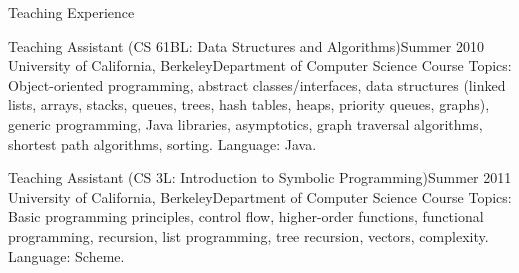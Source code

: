 \documentclass{resume}
\begin{document}
\begin{component}{Teaching Experience}
  \begin{position}{Teaching Assistant (CS 61BL: Data Structures and Algorithms)}{Summer 2010}
    {University of California, Berkeley}{Department of Computer Science}
    {Course Topics: Object-oriented programming, abstract classes/interfaces, data structures (linked lists, arrays, stacks, queues, trees, hash tables, heaps, priority queues, graphs), generic programming, Java libraries, asymptotics, graph traversal algorithms, shortest path algorithms, sorting. Language: Java.}
  \end{position}

  \begin{position}{Teaching Assistant (CS 3L: Introduction to Symbolic Programming)}{Summer 2011}
    {University of California, Berkeley}{Department of Computer Science}
    {Course Topics: Basic programming principles, control flow, higher-order functions, functional programming, recursion, list programming, tree recursion, vectors, complexity. Language: Scheme.}
  \end{position}

\end{component}
\end{document}
